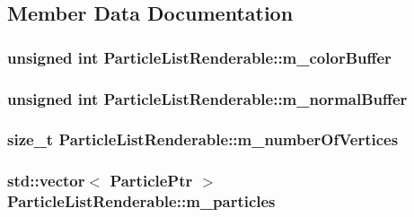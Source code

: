 \subsection{Member Data Documentation}
\hypertarget{classParticleListRenderable_a7e967af4fe279662d35d1cf08e4e2e86}{
\subsubsection[{m\+\_\+color\+Buffer}]{\setlength{\rightskip}{0pt plus 5cm}unsigned int Particle\+List\+Renderable\+::m\+\_\+color\+Buffer\hspace{0.3cm}{\ttfamily [private]}}}\label{classParticleListRenderable_a7e967af4fe279662d35d1cf08e4e2e86}
\hypertarget{classParticleListRenderable_ae6b22324c801f946afe8a9eee5ff7be5}{
\subsubsection[{m\+\_\+normal\+Buffer}]{\setlength{\rightskip}{0pt plus 5cm}unsigned int Particle\+List\+Renderable\+::m\+\_\+normal\+Buffer\hspace{0.3cm}{\ttfamily [private]}}}\label{classParticleListRenderable_ae6b22324c801f946afe8a9eee5ff7be5}
\hypertarget{classParticleListRenderable_a0971e99dfa53c5729d040b6a96d47a4f}{
\subsubsection[{m\+\_\+number\+Of\+Vertices}]{\setlength{\rightskip}{0pt plus 5cm}size\+\_\+t Particle\+List\+Renderable\+::m\+\_\+number\+Of\+Vertices\hspace{0.3cm}{\ttfamily [private]}}}\label{classParticleListRenderable_a0971e99dfa53c5729d040b6a96d47a4f}
\hypertarget{classParticleListRenderable_a2debf6d432dfd9854718e0c16c4f6f51}{
\subsubsection[{m\+\_\+particles}]{\setlength{\rightskip}{0pt plus 5cm}std\+::vector$<$ {\bf Particle\+Ptr} $>$ Particle\+List\+Renderable\+::m\+\_\+particles\hspace{0.3cm}{\ttfamily [private]}}}\label{classParticleListRenderable_a2debf6d432dfd9854718e0c16c4f6f51}
